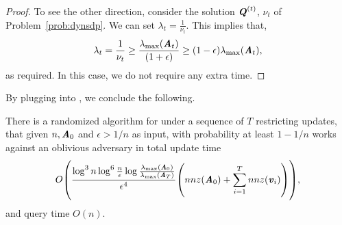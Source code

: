\begin{proof}
To see the other direction, consider the solution $\QQ^{(t)}$, $\nu_t$ of Problem~\ref{prob:dynsdp}. We can set $\lambda_t = \frac{1}{\nu_t}$. This implies that,
\[
\lambda_t = \frac{1}{\nu_t}\geq \frac{\lambda_{\max}(\AA_t)}{(1+\epsilon)} \geq (1-\epsilon)\lambda_{\max}(\AA_t),
\]
as required. In this case, we do not require any extra time.
\end{proof}

By plugging  into , we conclude the following.
\begin{corollary} There is a randomized algorithm for  under a sequence of $T$ restricting updates, that given $n, \AA_0$ and $\epsilon>1/n$ as input, with probability at least $1-1/n$ works against an oblivious adversary in total update time
\[
 O\left(\frac{\log^{3}n \log^6 \frac{n}{\epsilon}\log \frac{\lambda_{\max}(\AA_0)}{\lambda_{\max}(\AA_T)}}{\epsilon^{4}}\left(nnz(\AA_0) + \sum_{i=1}^T nnz(\vv_i)\right) \right),
 \]
and query time $O(n)$.
\end{corollary}